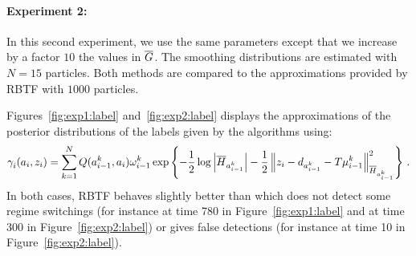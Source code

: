 \paragraph{Experiment 2:}
In this second experiment, we use the same parameters except that we increase by a factor $10$ the values in $\barG$. 
The smoothing distributions are estimated with $N=15$ particles. Both methods are compared to the approximations provided by RBTF with $1000$ particles. 

\medskip




Figures~\ref{fig:exp1:label} and~\ref{fig:exp2:label} displays the approximations of the  posterior distributions of the labels given by the algorithms using:
\[
\gamma^{}_i (a_i, z_i) = \sum_{k=1}^{N} Q(a^{k}_{i-1},a_i) \omega^{k}_{i-1} \exp\left\{ -\frac{1}{2} \log \left|\barH_{a^k_{i-1}} \right| -\frac{1}{2}\normMat{\barH_{a^k_{i-1}}}{z_i - d_{a^k_{i-1}} -T \mu^k_{i-1} }^2\right\} \eqsp.
\]
In both cases, RBTF behaves slightly better than \cite{briers:doucet:maskell:2010} which does not detect some regime switchings (for instance  at time 780 in Figure~\ref{fig:exp1:label} and at time 300 in Figure~\ref{fig:exp2:label}) or gives false detections (for instance at time 10 in Figure~\ref{fig:exp2:label}).

